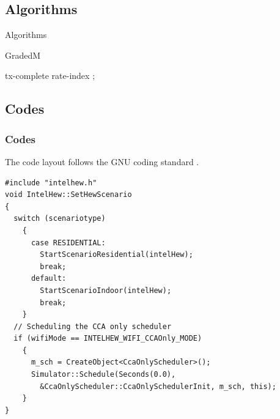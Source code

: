 \subsection{Algorithms}
\begin{frame}{Algorithms}
\begin{algorithm}[H]
\renewcommand{\algorithmicrequire}{\textbf{Input:}}
\renewcommand{\algorithmicensure}{\textbf{Output:}}
\caption{GradedM}
\label{alg:graded}
\begin{scriptsize}
\begin{algorithmic}[1]
\Require tx-complete 
\Ensure  rate-index 
 
\EndWhile
{}
 
\EndIf
{}
\EndIf
\State {}
\label{funcDSWA}
  ; 
\EndFunction
\end{algorithmic}
\end{scriptsize}
\end{algorithm}
\end{frame}

\subsection{Codes}
\begin{frame}[fragile]
\frametitle{Codes}
The code layout follows the GNU coding standard .
\begin{lstlisting}
#include "intelhew.h"
void IntelHew::SetHewScenario
{
  switch (scenariotype)
    {
      case RESIDENTIAL:
        StartScenarioResidential(intelHew);
        break;
      default:
        StartScenarioIndoor(intelHew);
        break;
    }
  // Scheduling the CCA only scheduler
  if (wifiMode == INTELHEW_WIFI_CCAOnly_MODE)
    {
      m_sch = CreateObject<CcaOnlyScheduler>();
      Simulator::Schedule(Seconds(0.0),
        &CcaOnlyScheduler::CcaOnlySchedulerInit, m_sch, this);
    }
}
\end{lstlisting}
\end{frame}
